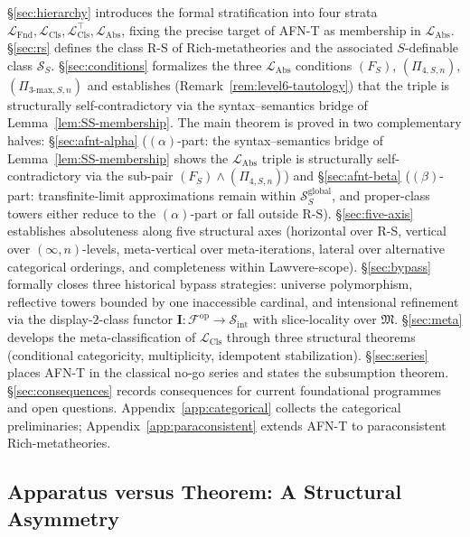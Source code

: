 \documentclass[11pt]{article}
\theoremstyle{plain}
\theoremstyle{definition}
\newcommand{\RS}{\mathrm{R\text{-}S}}
\newcommand{\cS}{\mathcal{S}}
\newcommand{\cF}{\mathcal{F}}
\newcommand{\fM}{\mathfrak{M}}
\newcommand{\LFnd}{\mathcal{L}_{\mathrm{Fnd}}}
\newcommand{\LCls}{\mathcal{L}_{\mathrm{Cls}}}
\newcommand{\LClsMax}{\mathcal{L}_{\mathrm{Cls}}^{\top}}
\newcommand{\LAbs}{\mathcal{L}_{\mathrm{Abs}}}
\newcommand{\Sint}{\cS_{\mathrm{int}}}
\newcommand{\II}{\mathbf{I}}
\begin{document}
\S\ref{sec:hierarchy} introduces the formal stratification into four strata $\LFnd, \LCls, \LClsMax, \LAbs$, fixing the precise target of AFN-T as membership in $\LAbs$. \S\ref{sec:rs} defines the class $\RS$ of Rich-metatheories and the associated $S$-definable class $\cS_S$. \S\ref{sec:conditions} formalizes the three $\LAbs$ conditions $(F_S)$, $(\Pi_{4, S, n})$, $(\Pi_{3\text{-max}, S, n})$ and establishes (Remark~\ref{rem:level6-tautology}) that the triple is structurally self-contradictory via the syntax--semantics bridge of Lemma~\ref{lem:SS-membership}. The main theorem is proved in two complementary halves: \S\ref{sec:afnt-alpha} ($(\alpha)$-part: the syntax--semantics bridge of Lemma~\ref{lem:SS-membership} shows the $\LAbs$ triple is structurally self-contradictory via the sub-pair $(F_S) \wedge (\Pi_{4, S, n})$) and \S\ref{sec:afnt-beta} ($(\beta)$-part: transfinite-limit approximations remain within $\cS_S^{\mathrm{global}}$, and proper-class towers either reduce to the $(\alpha)$-part or fall outside $\RS$). \S\ref{sec:five-axis} establishes absoluteness along five structural axes (horizontal over R-S, vertical over $(\infty, n)$-levels, meta-vertical over meta-iterations, lateral over alternative categorical orderings, and completeness within Lawvere-scope). \S\ref{sec:bypass} formally closes three historical bypass strategies: universe polymorphism, reflective towers bounded by one inaccessible cardinal, and intensional refinement via the display-$2$-class functor $\II : \cF^{\mathrm{op}} \to \Sint$ with slice-locality over $\fM$. \S\ref{sec:meta} develops the meta-classification of $\LCls$ through three structural theorems (conditional categoricity, multiplicity, idempotent stabilization). \S\ref{sec:series} places AFN-T in the classical no-go series and states the subsumption theorem. \S\ref{sec:consequences} records consequences for current foundational programmes and open questions. Appendix~\ref{app:categorical} collects the categorical preliminaries; Appendix~\ref{app:paraconsistent} extends AFN-T to paraconsistent Rich-metatheories.

\subsection{Apparatus versus Theorem: A Structural Asymmetry}\label{sec:apparatus-vs-theorem}
\end{document}

